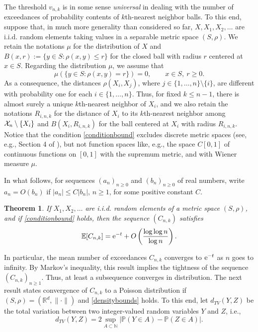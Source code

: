 \documentclass{article}
\theoremstyle{thm}
\newtheorem{theorem}{Theorem}[section]
\theoremstyle{definition}
\theoremstyle{definition}
\theoremstyle{def}
\newcommand{\RR}{\mathbb{R}} %
\newcommand{\NN}{\mathbb{N}} %
\newcommand{\E}{\mathbb{E}} %
\newcommand{\PP}{\mathbb{P}} %
\begin{document}
The threshold $v_{n,k}$ is in some sense {\em universal} in dealing with the number of exceedances of probability contents of $k$th-nearest neighbor balls. To this end, suppose that, in
much more generality than considered so far, $X,X_1,X_2, \ldots $ are i.i.d. random elements taking values in a separable metric space $(S,\rho)$.
We retain the notations $\mu$ for the distribution of $X$ and $B(x,r) := \{y \in S: \rho(x,y) \le r\}$ for the closed ball with radius $r$ centered at $x \in S$. Regarding the distribution
$\mu$, we assume that
\begin{equation}\label{conditionbound}
\mu(\{y \in S: \rho(x,y) =r\}) =0, \qquad x \in S, \ r \ge 0.
\end{equation}
As a consequence, the distances $\rho(X_i,X_j)$, where $j \in \{1,\ldots,n\} \setminus \{i\}$, are different with probability    one
for each $i \in \{1,\ldots,n\}$. Thus, for fixed $k \le n-1$, there is almost surely a unique $k$th-nearest neighbor of $X_i$,
and we also retain the notations $R_{i,n,k}$ for the distance of  $X_i$ to its $k$th-nearest neighbor among ${\cal X}_n \setminus \{X_i\}$ and
$B(X_i,R_{i,n,k})$ for the ball centered at $X_i$ with radius $R_{i,n,k}$. Notice that the condition \eqref{conditionbound} excludes discrete metric spaces (see, e.g., Section 4 of \cite{ZO18}),
but not function spaces like, e.g., the space $C[0,1]$ of continuous functions on $[0,1]$ with the supremum metric, and with Wiener measure $\mu$. 

\medskip

{In what follows, for sequences $(a_n)_{n\geq 0}$ and $(b_n)_{n\geq 0}$ of real numbers, write $a_n=O(b_n)$ if  $|a_n|\leq C|b_n|$, $n\geq 1$, for some positive constant $C$.}

\begin{theorem}\label{thmmetricspace}
If $X_1,X_2, \ldots$ are i.i.d. random elements of a metric space $(S,\rho)$, and if \eqref{conditionbound} holds, then
the sequence $(C_{n,k})$ satisfies
\[
 \E[C_{n,k}] = {\rm e}^{-t} + O\left( \frac{\log\log n}{\log n}  \right).
\]
\end{theorem}

\medskip

In particular, the mean number of exceedances $C_{n,k}$ converges to ${\rm e}^{-t}$ as $n$ goes to infinity.
 By Markov's inequality, this result implies the tightness of the sequence $(C_{n,k})_{n \ge 1}$. Thus, at least a subsequence converges in distribution.
The next result states convergence of $C_{n,k}$ to a Poisson distribution if $(S,\rho) = (\RR^d,\|\cdot\|)$ and \eqref{densitybounds} holds.
To this end, let $d_{TV}(Y,Z)$ be the total variation between two integer-valued random variables $Y$ and $Z$, i.e.,
\[
d_{TV}(Y, Z) = 2\sup_{A\subset \NN}|\PP(Y\in A) -\PP(Z\in A)|.
\]
\end{document}
